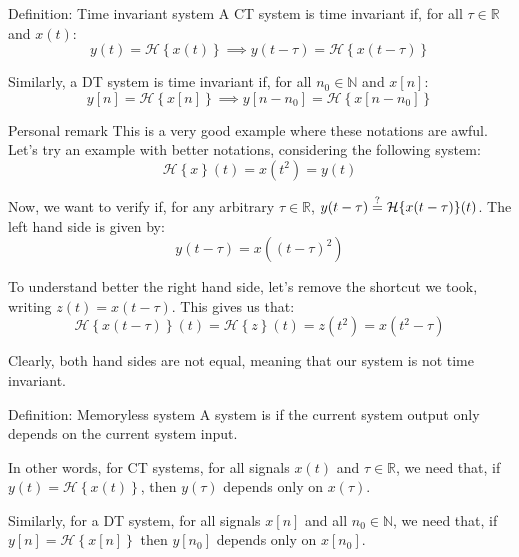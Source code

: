 \documentclass[a4paper]{article}
\begin{document}
\begin{parag}{Definition: Time invariant system}
    A CT system is time invariant if, for all $\tau \in \mathbb{R}$ and $x\left(t\right)$: 
    \[y\left(t\right) = \mathcal{H}\left\{x\left(t\right)\right\} \implies y\left(t - \tau\right) = \mathcal{H}\left\{x\left(t - \tau\right)\right\}\]
    
    Similarly, a DT system is time invariant if, for all $n_0 \in \mathbb{N}$ and $x\left[n\right]$: 
    \[y\left[n\right] = \mathcal{H}\left\{x\left[n\right]\right\} \implies y\left[n - n_0\right] = \mathcal{H}\left\{x\left[n - n_0\right]\right\}\]
    
    \begin{subparag}{Personal remark}
        This is a very good example where these notations are awful. Let's try an example with better notations, considering the following system: 
        \[\mathcal{H}\left\{x\right\}\left(t\right) = x\left(t^2\right) = y\left(t\right)\]
        
        Now, we want to verify if, for any arbitrary $\tau \in \mathbb{R}$, $y\left(t - \tau\right) \over{=}{?} \mathcal{H}\left\{x\left(t - \tau\right)\right\}\left(t\right)$. The left hand side is given by: 
        \[y\left(t - \tau\right) = x\left(\left(t - \tau\right)^2\right)\]
        
        To understand better the right hand side, let's remove the shortcut we took, writing $z\left(t\right) = x\left(t - \tau\right)$. This gives us that: 
        \[\mathcal{H}\left\{x\left(t - \tau\right)\right\}\left(t\right) = \mathcal{H}\left\{z\right\}\left(t\right) = z\left(t^2\right) = x\left(t^2 - \tau\right)\]

        Clearly, both hand sides are not equal, meaning that our system is not time invariant.
    \end{subparag}
\end{parag}

\begin{parag}{Definition: Memoryless system}
    A system is  if the current system output only depends on the current system input.

    In other words, for CT systems, for all signals $x\left(t\right)$ and $\tau \in \mathbb{R}$, we need that, if $y\left(t\right) = \mathcal{H}\left\{x\left(t\right)\right\}$, then $y\left(\tau\right)$ depends only on $x\left(\tau\right)$.

    Similarly, for a DT system, for all signals $x\left[n\right]$ and all $n_0 \in \mathbb{N}$, we need that, if $y\left[n\right] = \mathcal{H}\left\{x\left[n\right]\right\}$ then $y\left[n_0\right]$ depends only on $x\left[n_0\right]$.
\end{parag}
\end{document}
